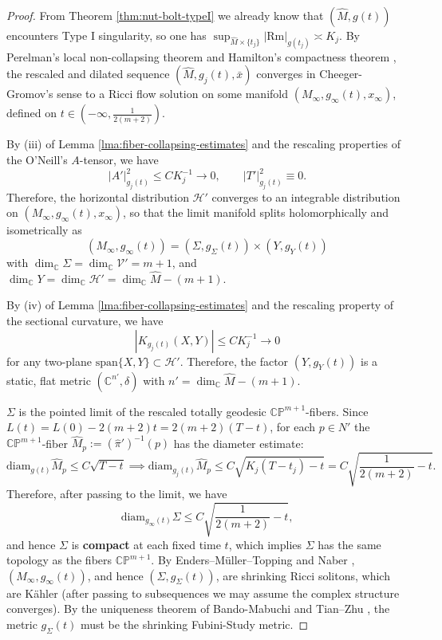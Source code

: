\documentclass[11pt]{amsart}
\theoremstyle{plain}
\numberwithin{equation}{section}
\theoremstyle{definition}
\theoremstyle{remark}
\begin{document}
\begin{proof}
From Theorem \ref{thm:nut-bolt-typeI} we already know that $(\widehat{M}, g(t))$ encounters Type I singularity, so one has $\sup_{\widehat{M} \times \{t_j\}}|\textrm{Rm}|_{g(t_j)} \asymp K_j$. By Perelman's local non-collapsing theorem \cite{Perelman} and Hamilton's compactness theorem \cite{HamCompact}, the rescaled and dilated sequence $(\widehat{M}, g_j(t), \bar{x})$ converges in Cheeger-Gromov's sense to a Ricci flow solution on some manifold $(M_\infty, g_\infty(t), x_\infty)$, defined on $t \in (-\infty, \frac{1}{2(m+2)})$.

By (iii) of Lemma \ref{lma:fiber-collapsing-estimates} and the rescaling properties of the O'Neill's $A$-tensor, we have
\[| A' |^2_{g_j(t)} \leq C K_j^{-1} \to 0, \qquad |T'|_{g_j(t)}^2 \equiv 0.\]
Therefore, the horizontal distribution $\mathcal{H}'$ converges to an integrable distribution on $(M_\infty, g_\infty(t), x_\infty)$, so that the limit manifold splits holomorphically and isometrically as 
\[(M_\infty, g_\infty(t)) = (\Sigma, g_\Sigma(t)) \times (Y, g_Y(t))\]
with $\dim_{\mathbb{C}} \Sigma = \dim_{\mathbb{C}} \mathcal{V}' = m + 1$, and $\dim_{\mathbb{C}} Y = \dim_{\mathbb{C}}\mathcal{H}' = \dim_{\mathbb{C}}\widehat{M} - (m+1)$.

By (iv) of Lemma \ref{lma:fiber-collapsing-estimates} and the rescaling property of the sectional curvature, we have
\[|K_{g_j(t)}(X,Y)| \leq CK_j^{-1} \to 0\]
for any two-plane $\textrm{span}\{X,Y\} \subset \mathcal{H}'$. Therefore, the factor $(Y,g_Y(t))$ is a static, flat metric $(\mathbb{C}^{n'}, \delta)$ with $n' = \dim_{\mathbb{C}}\widehat{M} - (m+1)$.

$\Sigma$ is the pointed limit of the rescaled totally geodesic $\mathbb{CP}^{m+1}$-fibers. Since $L(t) = L(0) - 2(m+2)t = 2(m+2)(T-t)$, for each $p \in N'$ the $\mathbb{CP}^{m+1}$-fiber $\widehat{M}_p := (\widehat{\pi}')^{-1}(p)$ has the diameter estimate:
\[\textrm{diam}_{g(t)}\widehat{M}_p \leq C\sqrt{T-t} \implies \mathrm{diam}_{g_j(t)}\widehat{M}_p \leq C\sqrt{K_j(T-t_j) - t} = C\sqrt{\frac{1}{2(m+2)}-t}.\]
Therefore, after passing to the limit, we have
\[\textrm{diam}_{g_\infty(t)}\Sigma \leq C\sqrt{\frac{1}{2(m+2)}-t},\]
and hence $\Sigma$ is \textbf{compact} at each fixed time $t$, which implies $\Sigma$ has the same topology as the fibers $\mathbb{CP}^{m+1}$. By Enders--Müller--Topping \cite{EMT} and Naber \cite{Naber}, $(M_\infty, g_\infty(t))$, and hence $(\Sigma, g_\Sigma(t))$, are shrinking Ricci solitons, which are K\"ahler (after passing to subsequences we may assume the complex structure converges). By the uniqueness theorem of Bando-Mabuchi \cite{BM} and Tian--Zhu \cite{TZhu}, the metric $g_\Sigma(t)$ must be the shrinking Fubini-Study metric.
\end{proof}
\end{document}
